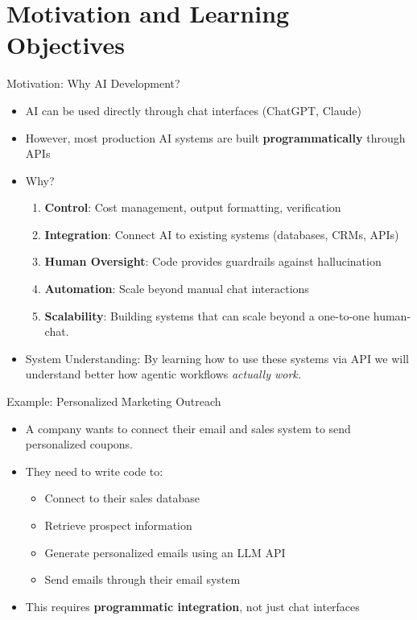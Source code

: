 \documentclass[aspectratio=169]{beamer}
\begin{document}
\section{Motivation and Learning Objectives}

\begin{frame}{Motivation: Why AI Development?}
\begin{itemize}
    \item AI can be used directly through chat interfaces (ChatGPT, Claude)
    \item However, most production AI systems are built \textbf{programmatically} through APIs
    \item Why?
    \begin{enumerate}
        \item \textbf{Control}: Cost management, output formatting, verification
        \item \textbf{Integration}: Connect AI to existing systems (databases, CRMs, APIs)
        \item \textbf{Human Oversight}: Code provides guardrails against hallucination
        \item \textbf{Automation}: Scale beyond manual chat interactions
        \item \textbf{Scalability}: Building systems that can scale beyond a one-to-one human-chat.
    \end{enumerate}
    \item System Understanding: By learning how to use these systems via API we will understand better how agentic workflows \it{actually} work.
\end{itemize}
\end{frame}

\begin{frame}{Example: Personalized Marketing Outreach}
\begin{itemize}
    \item A company wants to connect their email and sales system to send personalized coupons.
    \item They need to write code to:
    \begin{itemize}
        \item Connect to their sales database
        \item Retrieve prospect information
        \item Generate personalized emails using an LLM API
        \item Send emails through their email system
    \end{itemize}
    \item This requires \textbf{programmatic integration}, not just chat interfaces
\end{itemize}
\end{frame}
\end{document}

